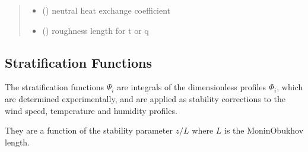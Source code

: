 \documentclass[letterpaper,10pt,english]{sphinxmanual}
\begin{document}
\begin{fulllineitems}
\begin{quote}
\begin{description}
\begin{itemize}
\end{itemize}

\sphinxAtStartPar
\begin{itemize}
\item {}
\sphinxAtStartPar
{} () \textendash{} neutral heat exchange coefficient

\item {}
\sphinxAtStartPar
{} () \textendash{} roughness length for t or q

\end{itemize}


\end{description}\end{quote}

\end{fulllineitems}



\subsection{Stratification Functions}
\label{\detokenize{users_guide:module-AirSeaFluxCode.flux_subs.stratification}}\label{\detokenize{users_guide:stratification-functions}}
\sphinxAtStartPar
The stratification functions \(\Psi_i\) are integrals of the dimensionless profiles
\(\Phi_i\), which are determined experimentally, and are applied as stability
corrections to the wind speed, temperature and humidity profiles.

\sphinxAtStartPar
They are a function of the stability parameter \(z/L\) where \(L\) is the
Monin\sphinxhyphen{}Obukhov length.
\end{document}

